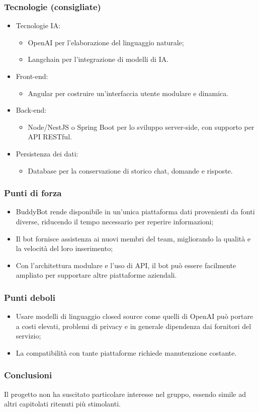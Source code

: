     \subsubsection{Tecnologie (consigliate)}
    \begin{itemize}
        \item Tecnologie IA:
        \begin{itemize}
            \item OpenAI per l'elaborazione del linguaggio naturale;
            \item Langchain per l’integrazione di modelli di IA.
        \end{itemize}
        \item Front-end:
        \begin{itemize}
            \item Angular per costruire un'interfaccia utente modulare e dinamica.
        \end{itemize}
        \item Back-end:
        \begin{itemize}
            \item Node/NestJS o Spring Boot per lo sviluppo server-side, con supporto per API RESTful.
        \end{itemize}
        \item Persistenza dei dati:
        \begin{itemize}
            \item Database per la conservazione di storico chat, domande e risposte.
        \end{itemize}
    \end{itemize}
    \subsubsection{Punti di forza}
    \begin{itemize}
        \item BuddyBot rende disponibile in un’unica piattaforma dati provenienti da fonti diverse, riducendo il tempo necessario per reperire informazioni;
        \item Il bot fornisce assistenza ai nuovi membri del team, migliorando la qualità e la velocità del loro inserimento;
        \item Con l’architettura modulare e l’uso di API, il bot può essere facilmente ampliato per supportare altre piattaforme aziendali.
    \end{itemize}
    \subsubsection{Punti deboli}
    \begin{itemize}
        \item Usare modelli di linguaggio closed source come quelli di OpenAI può portare a costi elevati, problemi di privacy e in generale dipendenza dai fornitori del servizio;
        \item La compatibilità con tante piattaforme richiede manutenzione costante.
    \end{itemize}
    \subsubsection{Conclusioni}
    Il progetto non ha suscitato particolare interesse nel gruppo, essendo simile ad altri capitolati ritenuti più stimolanti.



